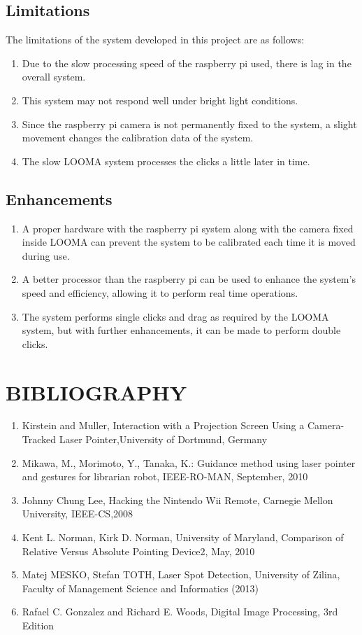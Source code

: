 \documentclass[12pt, a4paper]{article}
\begin{document}
\subsection{Limitations}
The limitations of the system developed in this project are as follows:
\begin{enumerate}
\item Due to the slow processing speed of the raspberry pi used, there is lag in the overall system. 
\item This system may not respond well under bright light conditions.
\item Since the raspberry pi camera is not permanently fixed to the system, a slight movement changes the calibration data of the system.
\item The slow LOOMA system processes the clicks a little later in time.
\end{enumerate}

\subsection{Enhancements}
\begin{enumerate}
\item A proper hardware with the raspberry pi system along with the camera fixed inside LOOMA can prevent the system to be calibrated each time it is moved during use.
\item A better processor than the raspberry pi can be used to enhance the system’s speed and efficiency, allowing it to perform real time operations.
\item The system performs single clicks and drag as required by the LOOMA system, but with further enhancements, it can be made to perform double clicks.
\end{enumerate}
\newpage
\section{BIBLIOGRAPHY}
\begin{enumerate}
\item Kirstein and Muller, Interaction with a Projection Screen Using a Camera-Tracked Laser Pointer,University of Dortmund, Germany
\item Mikawa, M., Morimoto, Y., Tanaka, K.: Guidance method using laser pointer and gestures for librarian robot, IEEE-RO-MAN, September, 2010
\item Johnny Chung Lee, Hacking the Nintendo Wii Remote, Carnegie Mellon University, IEEE-CS,2008 
\item Kent L. Norman, Kirk D. Norman, University of Maryland, Comparison of Relative Versus Absolute Pointing Device2, May, 2010
\item Matej MESKO, Stefan TOTH, Laser Spot Detection, University of Zilina, Faculty of Management Science and Informatics (2013) 
\item Rafael C. Gonzalez and Richard E. Woods, Digital Image Processing, 3rd Edition
\end{enumerate}
\end{document}
